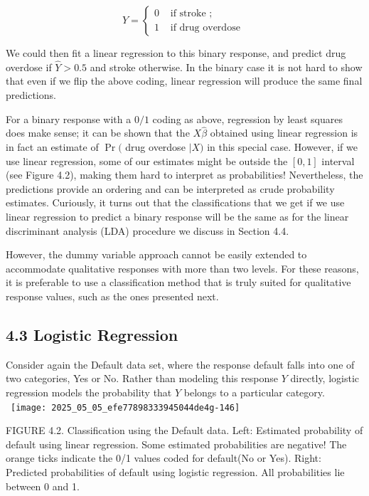 \documentclass[10pt]{article}
\begin{document}
$$
Y= \begin{cases}0 & \text { if stroke } ; \\ 1 & \text { if drug overdose }\end{cases}
$$

We could then fit a linear regression to this binary response, and predict drug overdose if $\hat{Y}>0.5$ and stroke otherwise. In the binary case it is not hard to show that even if we flip the above coding, linear regression will produce the same final predictions.

For a binary response with a $0 / 1$ coding as above, regression by least squares does make sense; it can be shown that the $X \hat{\beta}$ obtained using linear regression is in fact an estimate of $\operatorname{Pr}($ drug overdose $\mid X)$ in this special case. However, if we use linear regression, some of our estimates might be outside the $[0,1]$ interval (see Figure 4.2), making them hard to interpret as probabilities! Nevertheless, the predictions provide an ordering and can be interpreted as crude probability estimates. Curiously, it turns out that the classifications that we get if we use linear regression to predict a binary response will be the same as for the linear discriminant analysis (LDA) procedure we discuss in Section 4.4.

However, the dummy variable approach cannot be easily extended to accommodate qualitative responses with more than two levels. For these reasons, it is preferable to use a classification method that is truly suited for qualitative response values, such as the ones presented next.

\subsection*{4.3 Logistic Regression}
Consider again the Default data set, where the response default falls into one of two categories, Yes or No. Rather than modeling this response $Y$ directly, logistic regression models the probability that $Y$ belongs to a particular category.\
\
\texttt{[image: 2025\_05\_05\_efe77898333945044de4g-146]}

FIGURE 4.2. Classification using the Default data. Left: Estimated probability of default using linear regression. Some estimated probabilities are negative! The orange ticks indicate the 0/1 values coded for default(No or Yes). Right: Predicted probabilities of default using logistic regression. All probabilities lie between 0 and 1.
\end{document}
